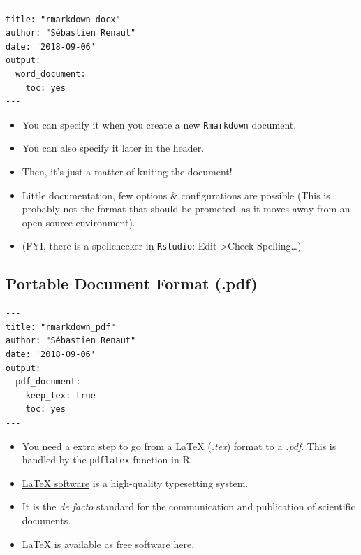 \documentclass[]{article}
\begin{document}
\begin{verbatim}
---  
title: "rmarkdown_docx"  
author: "Sébastien Renaut"  
date: '2018-09-06'  
output: 
  word_document: 
    toc: yes
---   
\end{verbatim}

\begin{itemize}
\item
  You can specify it when you create a new \texttt{Rmarkdown} document.
\item
  You can also specify it later in the header.
\item
  Then, it's just a matter of kniting the document!
\item
  Little documentation, few options \& configurations are possible (This
  is probably not the format that should be promoted, as it moves away
  from an open source environment).
\item
  (FYI, there is a spellchecker in \texttt{Rstudio}: Edit
  \textgreater{}Check Spelling\ldots{})
\end{itemize}

\hypertarget{portable-document-format-.pdf}{%
\subsection{Portable Document Format
(.pdf)}\label{portable-document-format-.pdf}}

\begin{verbatim}
---    
title: "rmarkdown_pdf"    
author: "Sébastien Renaut"    
date: '2018-09-06'    
output: 
  pdf_document:
    keep_tex: true
    toc: yes  
---    
\end{verbatim}

\begin{itemize}
\item
  You need a extra step to go from a LaTeX (\emph{.tex}) format to a
  \emph{.pdf}. This is handled by the \texttt{pdflatex} function in R.
\item
  \href{https://www.latex-project.org}{LaTeX software} is a high-quality
  typesetting system.
\item
  It is the \emph{de facto} standard for the communication and
  publication of scientific documents.
\item
  LaTeX is available as free software
  \href{https://www.latex-project.org/get/}{here}.
\end{itemize}
\end{document}

